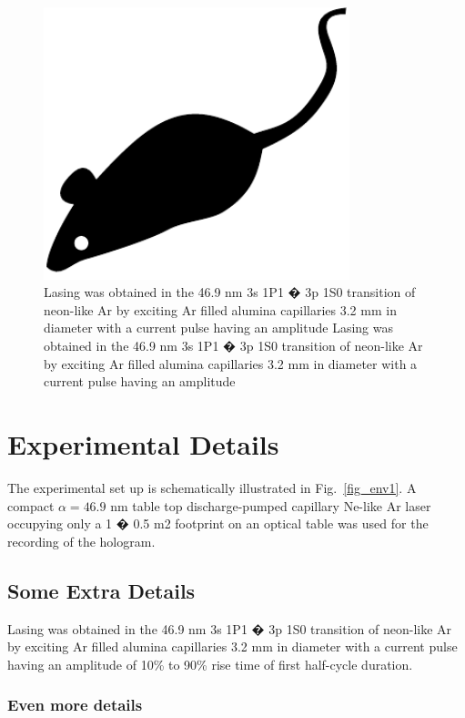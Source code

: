 \documentclass[]{IEEEphot}
\begin{document}
\begin{figure}[t]
\centering%
\includegraphics[width=21pc]{mouse}
\caption{Lasing was obtained in the 46.9 nm 3s 1P1 � 3p 1S0  transition of neon-like Ar by exciting Ar filled alumina capillaries 3.2 mm in diameter with a current pulse having an amplitude Lasing was obtained in the 46.9 nm 3s 1P1 � 3p 1S0  transition of neon-like Ar by exciting Ar filled alumina capillaries 3.2 mm in diameter with a current pulse having an amplitude}
\label{fig_env2}\vspace*{-6pt}
\end{figure}

\section{Experimental Details}

 The experimental set up is schematically illustrated in Fig.~\ref{fig_env1}. A compact $\alpha=46.9$ nm table top discharge-pumped capillary Ne-like Ar laser occupying only a 1 � 0.5 m2 footprint on an optical table was used for the recording of the hologram.    


\subsection{Some Extra Details}

 Lasing was obtained in the 46.9 nm 3s 1P1 � 3p 1S0  transition of neon-like Ar by exciting Ar filled alumina capillaries 3.2 mm in diameter with a current pulse having an amplitude of 10\% to 90\% rise time of first half-cycle duration.  

\subsubsection{Even more details}
\end{document}
